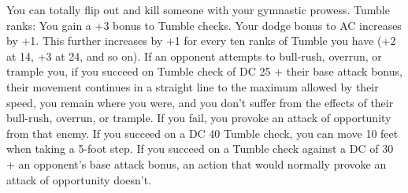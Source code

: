 \skillfeat
{You can totally flip out and kill someone with your gymnastic prowess.}
{Tumble ranks:}
{You gain a +3 bonus to Tumble checks.}
{Your dodge bonus to AC increases by +1. This further increases by +1 for every ten ranks of Tumble you have (+2 at 14, +3 at 24, and so on).}
{If an opponent attempts to bull-rush, overrun, or trample you, if you succeed on Tumble check of DC 25 + their base attack bonus, their movement continues in a straight line to the maximum allowed by their speed, you remain where you were, and you don't suffer from the effects of their bull-rush, overrun, or trample. If you fail, you provoke an attack of opportunity from that enemy.}
{If you succeed on a DC 40 Tumble check, you can move 10 feet when taking a 5-foot step.}
{If you succeed on a Tumble check against a DC of 30 + an opponent's base attack bonus, an action that would normally provoke an attack of opportunity doesn't.}